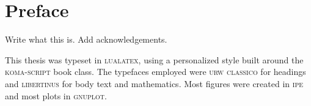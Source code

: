 \chapter*{Preface}\noindent
Write what this is. Add acknowledgements.


This thesis was typeset in \textsc{lualatex}, using a personalized style built around the \textsc{koma-script} book class.
The typefaces employed were \textsc{urw classico} for headings and \textsc{libertinus} for body text and mathematics.
Most figures were created in \textsc{ipe} and most plots in \textsc{gnuplot}.
